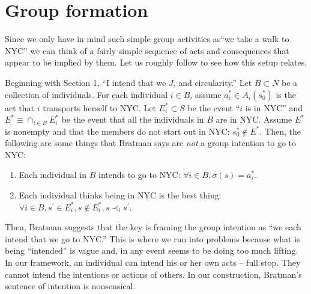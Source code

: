 \documentclass[
11pt,
titlepage,
reqno,
]{article}%
\theoremstyle{definition}
\begin{document}
	\section{Group formation}
	Since we only have in mind such simple group activities as``we take a walk to NYC'' we can think of a fairly simple sequence of acts and consequences that appear to be implied by them. Let us roughly follow \cite[][Ch. 2]{Bratman2014} to see how this setup relates. 
	
	Beginning with Section 1, ``I intend that we $J$, and circularity.'' Let $B\subset N$ be a collection of individuals. For each individual  $i\in B$, assume $a^\ast_i\in A_i(s_0^\ast)$ is the act that $i$ transports herself to NYC. Let $E^\ast_i\subset S$ be the event ``$i$ is in NYC'' and $E^\ast\equiv\cap_{i\in B}E^\ast_i$ be the event that all the individuals in $B$ are in NYC. Assume $E^\ast$ is nonempty and that the members do not start out in NYC: $s_0^\ast\notin E^\ast$. Then, the following are some things that Bratman says are \textit{not} a group intention to go to NYC:
	\begin{enumerate}
		\item Each individual in $B$ intends to go to NYC: $\forall i\in B, \sigma( s)=a^\ast_i$.
		\item Each individual thinks being in NYC is the best thing:  $\forall i\in B, s^\prime\in E^\ast_i,  s\notin E^\ast_i,  s\prec_i s^\prime$.
	\end{enumerate}
	
	Then, Bratman suggests that the key is framing the group intention as ``we each intend that we go to NYC.'' This is where we run into problems because what is being ``intended'' is vague and, in any event seems to be doing too much lifting. In our framework, an individual can intend his or her own acts -- full stop. They cannot intend the intentions or actions of others. In our construction, Bratman's sentence of intention is nonsensical. 
	
\end{document}
